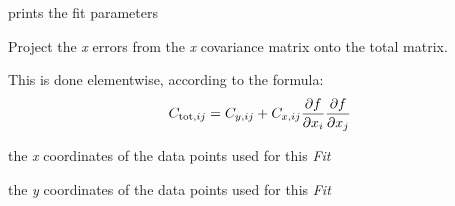 \documentclass[a4paper,10pt,english]{sphinxmanual}
\begin{document}
\begin{fulllineitems}
\begin{fulllineitems}
\end{fulllineitems}


\begin{fulllineitems}
\label{index:kafe.fit.Fit.print_rounded_fit_parameters}
prints the fit parameters

\end{fulllineitems}


\begin{fulllineitems}
\label{index:kafe.fit.Fit.project_x_covariance_matrix}
Project the \emph{x} errors from the \emph{x} covariance matrix onto the total matrix.

This is done elementwise, according to the formula:
\begin{gather}
\begin{split}C_{\text{tot},ij} = C_{y,ij} + C_{x,ij}  \frac{\partial f}{\partial x_i}  \frac{\partial f}{\partial x_j} \end{split}\notag
\end{gather}
\end{fulllineitems}


\begin{fulllineitems}
\label{index:kafe.fit.Fit.xdata}
the \emph{x} coordinates of the data points used for this \emph{Fit}

\end{fulllineitems}


\begin{fulllineitems}
\label{index:kafe.fit.Fit.ydata}
the \emph{y} coordinates of the data points used for this \emph{Fit}

\end{fulllineitems}


\end{fulllineitems}

\end{document}
